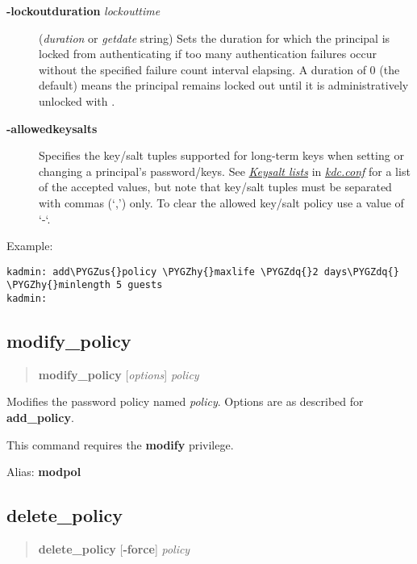 \documentclass[letterpaper,10pt,english]{sphinxmanual}
\def\PYGZus{\char`\_}
\def\PYGZhy{\char`\-}
\def\PYGZdq{\char`\"}
\begin{document}
\label{admin/database:policy-lockoutduration}\begin{description}
\item[{\textbf{-lockoutduration} \emph{lockouttime}}] \leavevmode
(\emph{duration} or \emph{getdate} string) Sets the duration for
which the principal is locked from authenticating if too many
authentication failures occur without the specified failure count
interval elapsing.  A duration of 0 (the default) means the
principal remains locked out until it is administratively unlocked
with .

\item[{\textbf{-allowedkeysalts}}] \leavevmode
Specifies the key/salt tuples supported for long-term keys when
setting or changing a principal's password/keys.  See
{\hyperref[admin/conf_files/kdc_conf:keysalt-lists]{\emph{Keysalt lists}}} in {\hyperref[admin/conf_files/kdc_conf:kdc-conf-5]{\emph{kdc.conf}}} for a list of the
accepted values, but note that key/salt tuples must be separated
with commas (`,') only.  To clear the allowed key/salt policy use
a value of `-`.

\end{description}

Example:

\begin{Verbatim}[commandchars=\\\{\}]
kadmin: add\PYGZus{}policy \PYGZhy{}maxlife \PYGZdq{}2 days\PYGZdq{} \PYGZhy{}minlength 5 guests
kadmin:
\end{Verbatim}


\subsection{modify\_policy}
\label{admin/database:modify-policy}\begin{quote}

\textbf{modify\_policy} {[}\emph{options}{]} \emph{policy}
\end{quote}

Modifies the password policy named \emph{policy}.  Options are as described
for \textbf{add\_policy}.

This command requires the \textbf{modify} privilege.

Alias: \textbf{modpol}


\subsection{delete\_policy}
\label{admin/database:delete-policy}\begin{quote}

\textbf{delete\_policy} {[}\textbf{-force}{]} \emph{policy}
\end{quote}
\end{document}
